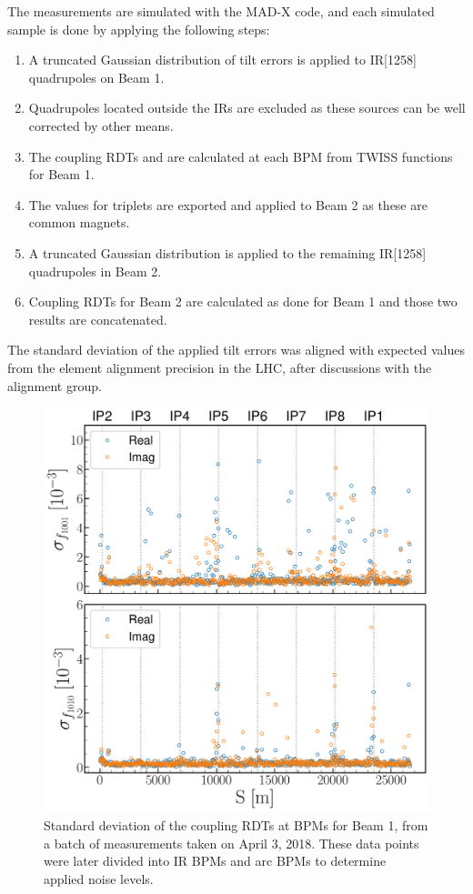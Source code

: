 The measurements are simulated with the MAD-X code, and each simulated sample is done by applying the following steps:

\begin{enumerate}
    \item A truncated Gaussian distribution of tilt errors \DPSI is applied to IR[1258] quadrupoles on Beam 1.
    \item Quadrupoles located outside the IRs are excluded as these sources can be well corrected by other means.
    \item The coupling RDTs \foneohone and \foneohoneoh are calculated at each BPM from TWISS functions for Beam 1.
    \item The \DPSI values for triplets are exported and applied to Beam 2 as these are common magnets.
    \item A truncated Gaussian distribution is applied to the remaining IR[1258] quadrupoles in Beam 2.
    \item Coupling RDTs for Beam 2 are calculated as done for Beam 1 and those two results are concatenated.
\end{enumerate}

The standard deviation of the applied tilt errors was aligned with expected values from the element alignment precision in the LHC, after discussions with the alignment group. 

\begin{figure}[!htb]
    \centering
    \includegraphics*[width=0.9\columnwidth]{Figures/Chapter5/rdts_stdev_batch.pdf}
    \caption{Standard deviation of the coupling RDTs at BPMs for Beam 1, from a batch of measurements taken on April 3, 2018. These data points were later divided into IR BPMs and arc BPMs to determine applied noise levels.}
    \label{fig:rdts_stdev_batch}
\end{figure}

